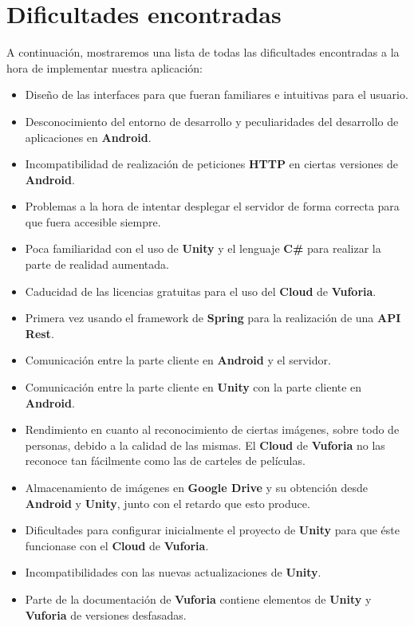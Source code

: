 \section{Dificultades encontradas}
\label{makereference4.4}
A continuación, mostraremos una lista de todas las dificultades encontradas a la hora de implementar nuestra aplicación:
\begin{itemize}
    \item Diseño de las interfaces para que fueran familiares e intuitivas para el usuario.
    \item Desconocimiento del entorno de desarrollo y peculiaridades del desarrollo de aplicaciones en \textbf{Android}.
    \item Incompatibilidad de realización de peticiones \textbf{HTTP} en ciertas versiones de \textbf{Android}.
    \item Problemas a la hora de intentar desplegar el servidor de forma correcta para que fuera accesible siempre.
    \item Poca familiaridad con el uso de \textbf{Unity} y el lenguaje \textbf{C\#} para realizar la parte de realidad aumentada.
    \item Caducidad de las licencias gratuitas para el uso del \textbf{Cloud} de \textbf{Vuforia}.
    \item Primera vez usando el framework de \textbf{Spring} para la realización de una \textbf{API Rest}.
    \item Comunicación entre la parte cliente en \textbf{Android} y el servidor.
    \item Comunicación entre la parte cliente en \textbf{Unity} con la parte cliente en \textbf{Android}.
    \item Rendimiento en cuanto al reconocimiento de ciertas imágenes, sobre todo de personas, debido a la calidad de las mismas. El \textbf{Cloud} de \textbf{Vuforia} no las reconoce tan fácilmente como las de carteles de películas.
    \item Almacenamiento de imágenes en \textbf{Google Drive} y su obtención desde \textbf{Android} y \textbf{Unity}, junto con el retardo que esto produce.
    \item Dificultades para configurar inicialmente el proyecto de \textbf{Unity} para que éste funcionase con el \textbf{Cloud} de \textbf{Vuforia}.
    \item Incompatibilidades con las nuevas actualizaciones de \textbf{Unity}.
    \item Parte de la documentación de \textbf{Vuforia} contiene elementos de \textbf{Unity} y \textbf{Vuforia} de versiones desfasadas.
\end{itemize}
